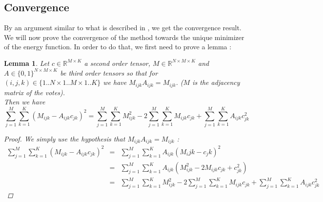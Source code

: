 \documentclass[12pt,a4paper]{article}
\newtheorem{lemma}{Lemma}
\begin{document}
\subsection{Convergence}
By an argument similar to what is described in \cite{Cristo1}, we get the convergence result.
We will now prove the convergence of the method towards the unique minimizer of the energy function. In order to do that, we first need to prove a lemma :
\begin{lemma}
Let $c\in \mathbb{R}^{M \times K}$ a second order tensor, $M\in \mathbb{R}^{N\times M \times K}$ and $A\in \{0,1\}^{N\times M \times K}$ be third order tensors so that for $(i,j,k) \in \{1..N \times 1..M \times 1..K \}$ we have $M_{ijk} A_{ijk} = M_{ijk}$. ($M$ is the adjacency matrix of the votes).\\
Then we have 
$$\sum_{j=1}^M \sum_{k=1}^K (M_{ijk}-A_{ijk} c_{jk})^2 = \sum_{j=1}^M \sum_{k=1}^K M_{ijk}^2 - 2\sum_{j=1}^M \sum_{k=1}^K M_{ijk}c_{jk} + \sum_{j=1}^M \sum_{k=1}^K A_{ijk} c_{jk}^2$$
\begin{proof}
We simply use the hypothesis that $M_{ijk}A_{ijk} = M_{ijk}$ :
\begin{eqnarray*}
\sum_{j=1}^M \sum_{k=1}^K (M_{ijk}-A_{ijk} c_{jk})^2 & = & \sum_{j=1}^M \sum_{k=1}^K A_{ijk}(M_ijk-c_jk)^2 \\
& = & \sum_{j=1}^M \sum_{k=1}^K A_{ijk} (M_{ijk}^2 - 2 M_{ijk}c_{jk} + c_{jk}^2)\\
& = & \sum_{j=1}^M \sum_{k=1}^K M_{ijk}^2 - 2\sum_{j=1}^M \sum_{k=1}^K M_{ijk}c_{jk} + \sum_{j=1}^M \sum_{k=1}^K A_{ijk} c_{jk}^2
\end{eqnarray*}
\end{proof}
\label{lemma:tens}
\end{lemma}
\end{document}
